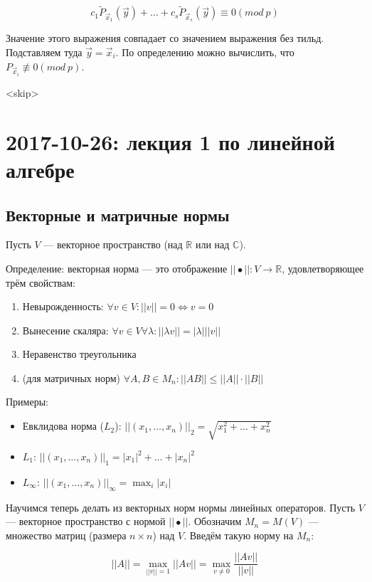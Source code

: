 \documentclass[12pt]{article}
\newcommand{\R}{\mathbb{R}}
\newcommand{\C}{\mathbb{C}}
\begin{document}
\[
c_1 \tilde{P}_{\vec x_1}(\vec y) + \ldots + c_s \tilde{P}_{\vec x_s}(\vec y) \equiv 0 (mod\ p)
\]

Значение этого выражения совпадает со значением выражения без тильд. Подставляем туда $\vec y = \vec x_i$. По определению можно вычислить, что $P_{\vec x_i} \not\equiv 0 (mod\ p)$.

<skip>

\section{2017-10-26: лекция 1 по линейной алгебре}

\subsection{Векторные и матричные нормы}

Пусть $V$ — векторное пространство (над $\R$ или над $\C$).

Определение: векторная норма — это отображение $||\bullet|| \colon V \to \R$, удовлетворяющее трём свойствам:

\begin{enumerate}
\item Невырожденность: $\forall v \in V \colon ||v|| = 0 \Leftrightarrow v = 0$
\item Вынесение скаляра: $\forall v \in V \forall \lambda \colon ||\lambda v|| = |\lambda| ||v||$
\item Неравенство треугольника
\item (для матричных норм) $\forall A, B \in M_n \colon ||AB|| \leq ||A|| \cdot ||B||$
\end{enumerate}

Примеры:

\begin{itemize}
\item Евклидова норма ($L_2$): $||(x_1, \ldots, x_n)||_2 = \sqrt{x_1^2 + \ldots + x_n^2}$
\item $L_1$: $||(x_1, \ldots, x_n)||_1 = |x_1|^2 + \ldots + |x_n|^2$
\item $L_\infty$: $||(x_1, \ldots, x_n)||_\infty = \max_i |x_i|$
\end{itemize}

Научимся теперь делать из векторных норм нормы линейных операторов. Пусть $V$ — векторное пространство с нормой $||\bullet||$. Обозначим $M_n = M(V)$ — множество матриц (размера $n \times n$) над $V$. Введём такую норму на $M_n$:

\[
||A|| = \max_{||v|| = 1} ||Av|| = \max_{v \neq 0} \frac {||Av||} {||v||}
\]
\end{document}
